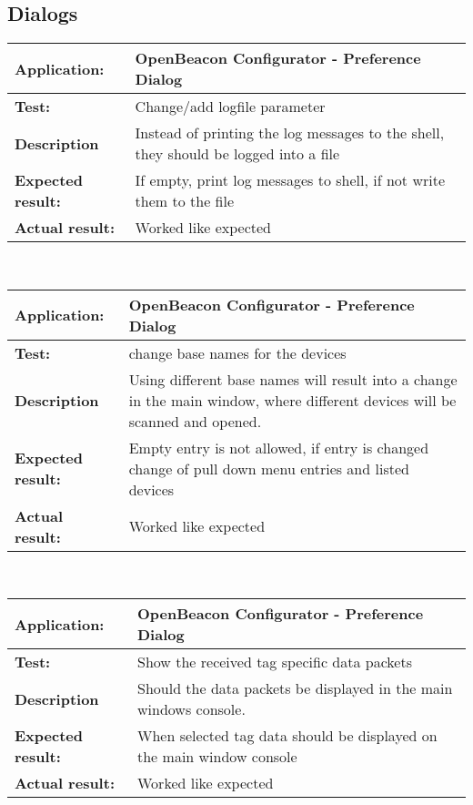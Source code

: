   \subsection{Dialogs}
   \begin{tabular}{|p{3.5cm}|p{10.5cm}|}
    \hline
     \textbf{Application:}	& OpenBeacon Configurator - Preference Dialog\\
    \hline
     \textbf{Test:}		& Change/add logfile parameter\\
    \hline
     \textbf{Description}	& Instead of printing the log messages to the shell, they should be logged into a file\\
    \hline
     \textbf{Expected result:}	& If empty, print log messages to shell, if not write them to the file\\
    \hline
     \textbf{Actual result:}	& Worked like expected\\
    \hline
   \end{tabular}\\
   \begin{tabular}{|p{3.5cm}|p{10.5cm}|}
    \hline
     \textbf{Application:}	& OpenBeacon Configurator - Preference Dialog\\
    \hline
     \textbf{Test:}		& change base names for the devices\\
    \hline
     \textbf{Description}	& Using different base names will result into a change in the main window, where different devices will be scanned and opened.\\
    \hline
     \textbf{Expected result:}	& Empty entry is not allowed, if entry is changed change of pull down menu entries and listed devices\\
    \hline
     \textbf{Actual result:}	& Worked like expected\\
    \hline
   \end{tabular}\\
   \begin{tabular}{|p{3.5cm}|p{10.5cm}|}
    \hline
     \textbf{Application:}	& OpenBeacon Configurator - Preference Dialog\\
    \hline
     \textbf{Test:}		& Show the received tag specific data packets\\
    \hline
     \textbf{Description}	& Should the data packets be displayed in the main windows console.\\
    \hline
     \textbf{Expected result:}	& When selected tag data should be displayed on the main window console\\
    \hline
     \textbf{Actual result:}	& Worked like expected\\
    \hline
   \end{tabular}\\
